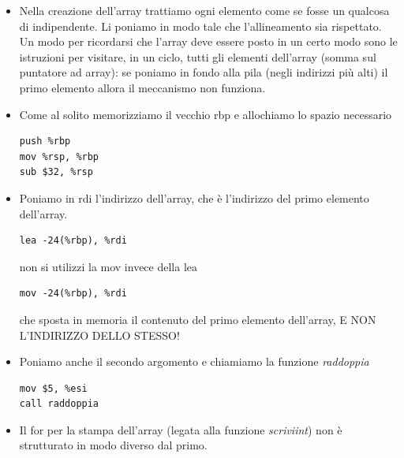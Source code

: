 \documentclass[11pt]{report}
\theoremstyle{definition}
\begin{document}
\begin{itemize}
\item Nella creazione dell'array trattiamo ogni elemento come se fosse un qualcosa di indipendente. Li poniamo in modo tale che l'allineamento sia rispettato. Un modo per ricordarsi che l'array deve essere posto in un certo modo sono le istruzioni per visitare, in un ciclo, tutti gli elementi dell'array (somma sul puntatore ad array): se poniamo in fondo alla pila (negli indirizzi più alti) il primo elemento allora il meccanismo non funziona.
\item Come al solito memorizziamo il vecchio rbp e allochiamo lo spazio necessario
\begin{verbatim}
push %rbp
mov %rsp, %rbp
sub $32, %rsp
\end{verbatim}
\item Poniamo in rdi l'indirizzo dell'array, che è l'indirizzo del primo elemento dell'array.
\begin{verbatim}
lea -24(%rbp), %rdi
\end{verbatim}
non si utilizzi la mov invece della lea
\begin{verbatim}
mov -24(%rbp), %rdi
\end{verbatim}
che sposta in memoria il contenuto del primo elemento dell'array, E NON L'INDIRIZZO DELLO STESSO!
\item Poniamo anche il secondo argomento e chiamiamo la funzione \emph{raddoppia}
\begin{verbatim}
mov $5, %esi
call raddoppia
\end{verbatim}
\item Il for per la stampa dell'array (legata alla funzione \emph{scriviint}) non è strutturato in modo diverso dal primo.
\end{itemize}
\end{document}
